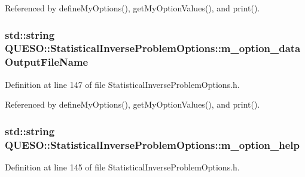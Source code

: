 Referenced by define\-My\-Options(), get\-My\-Option\-Values(), and print().

\hypertarget{class_q_u_e_s_o_1_1_statistical_inverse_problem_options_af1d009496381139b51679b891fc052f8}{
\subsubsection[{m\-\_\-option\-\_\-data\-Output\-File\-Name}]{\setlength{\rightskip}{0pt plus 5cm}std\-::string Q\-U\-E\-S\-O\-::\-Statistical\-Inverse\-Problem\-Options\-::m\-\_\-option\-\_\-data\-Output\-File\-Name\hspace{0.3cm}{\ttfamily [private]}}}\label{class_q_u_e_s_o_1_1_statistical_inverse_problem_options_af1d009496381139b51679b891fc052f8}


Definition at line 147 of file Statistical\-Inverse\-Problem\-Options.\-h.



Referenced by define\-My\-Options(), get\-My\-Option\-Values(), and print().

\hypertarget{class_q_u_e_s_o_1_1_statistical_inverse_problem_options_a6442fa5141155733851550abf54fb727}{
\subsubsection[{m\-\_\-option\-\_\-help}]{\setlength{\rightskip}{0pt plus 5cm}std\-::string Q\-U\-E\-S\-O\-::\-Statistical\-Inverse\-Problem\-Options\-::m\-\_\-option\-\_\-help\hspace{0.3cm}{\ttfamily [private]}}}\label{class_q_u_e_s_o_1_1_statistical_inverse_problem_options_a6442fa5141155733851550abf54fb727}


Definition at line 145 of file Statistical\-Inverse\-Problem\-Options.\-h.



